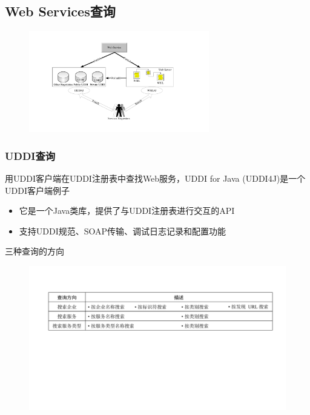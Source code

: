 \subsection{Web Services查询}

\begin{figure}[H]
    \vspace{-1.5em}
	\centering
	\includegraphics[width=0.7\textwidth]{images/Web Services查询.pdf}
    \vspace{-3em}
\end{figure}

\subsubsection{UDDI查询}
用UDDI客户端在UDDI注册表中查找Web服务，UDDI for Java (UDDI4J)是一个UDDI客户端例子
\begin{itemize}
    \item 它是一个Java类库，提供了与UDDI注册表进行交互的API
    \item 支持UDDI规范、SOAP传输、调试日志记录和配置功能
\end{itemize}

三种查询的方向
\begin{figure}[H]
    \vspace{-0.5em}
	\centering
	\includegraphics[width=\textwidth]{images/三种查询的方向.pdf}
    \vspace{-3em}
\end{figure}

